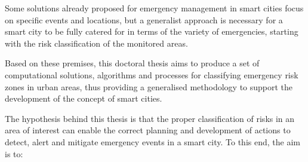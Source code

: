 \begin{refsection}
Some solutions already proposed for emergency management in smart cities focus on specific events and locations, but a generalist approach is necessary for a smart city to be fully catered for in terms of the variety of emergencies, starting with the risk classification of the monitored areas. 


Based on these premises, this doctoral thesis aims to produce a set of computational solutions, algorithms and processes for classifying emergency risk zones in urban areas, thus providing a generalised methodology to support the development of the concept of smart cities.


The hypothesis behind this thesis is that the proper classification of risks in an area of interest can enable the correct planning and development of actions to detect, alert and mitigate emergency events in a smart city. To this end, the aim is to:



\end{refsection}
